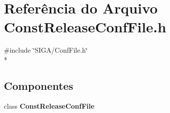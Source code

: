 \section{Referência do Arquivo Const\+Release\+Conf\+File.\+h}
\label{_const_release_conf_file_8h}
{\ttfamily \#include \char`\"{}S\+I\+G\+A/\+Conf\+File.\+h\char`\"{}}\\*
\subsection*{Componentes}
\begin{DoxyCompactItemize}
\item 
class {\bf Const\+Release\+Conf\+File}
\end{DoxyCompactItemize}
